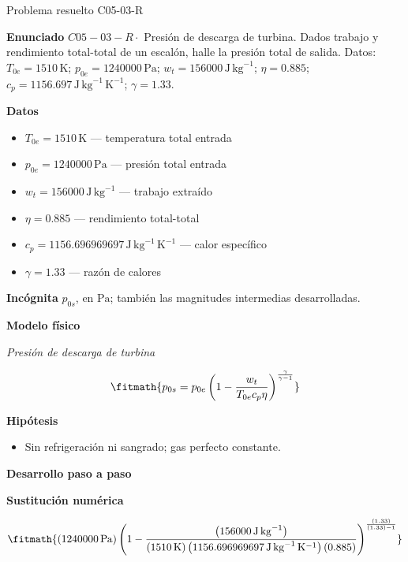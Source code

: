 \documentclass[10pt,openany]{book}
\begin{document}
\begin{studiumworked}{Problema resuelto C05-03-R}


\noindent\textbf{Enunciado}
\(C05-03-R \cdot\) Presión de descarga de turbina. Dados trabajo y rendimiento total-total de un escalón, halle la presión total de salida. Datos: \(T_{0e}=1510\, \mathrm{K}\); \(p_{0e}=1240000\, \mathrm{Pa}\); \(w_t=156000\, \mathrm{J}\,\mathrm{kg}^{-1}\); \(\eta=0.885\); \(c_p=1156.697\, \mathrm{J}\,\mathrm{kg}^{-1}\,\mathrm{K}^{-1}\); \(\gamma=1.33\).

\noindent\textbf{Datos}
\begin{itemize}
\item $T_{0e} = 1510\,\mathrm{K}$ — temperatura total entrada
\item $p_{0e} = 1240000\,\mathrm{Pa}$ — presión total entrada
\item $w_t = 156000\,\mathrm{J}\,\mathrm{kg}^{-1}$ — trabajo extraído
\item $\eta = 0.885$ — rendimiento total-total
\item $c_p = 1156.696969697\,\mathrm{J}\,\mathrm{kg}^{-1}\,\mathrm{K}^{-1}$ — calor específico
\item $\gamma = 1.33$ — razón de calores
\end{itemize}

\noindent\textbf{Incógnita}
$p_{0s}$, en $\mathrm{Pa}$; también las magnitudes intermedias desarrolladas.

\noindent\textbf{Modelo físico}

\noindent\textit{Presión de descarga de turbina}

\[
\fitmath{p_{0s}=p_{0e} \left(1 - \frac{w_t}{T_{0e} c_p \eta}\right)^{\frac{\gamma}{\gamma - 1}}}
\]

\noindent\textbf{Hipótesis}
\begin{itemize}
\item Sin refrigeración ni sangrado; gas perfecto constante.
\end{itemize}

\noindent\textbf{Desarrollo paso a paso}



\noindent\textbf{Sustitución numérica}

\[
\fitmath{\left(1240000\,\mathrm{Pa}\right) \left(1 - \frac{\left(156000\,\mathrm{J}\,\mathrm{kg}^{-1}\right)}{\left(1510\,\mathrm{K}\right) \left(1156.696969697\,\mathrm{J}\,\mathrm{kg}^{-1}\,\mathrm{K}^{-1}\right) \left(0.885\right)}\right)^{\frac{\left(1.33\right)}{\left(1.33\right) - 1}}}
\]


\end{studiumworked}
\end{document}
